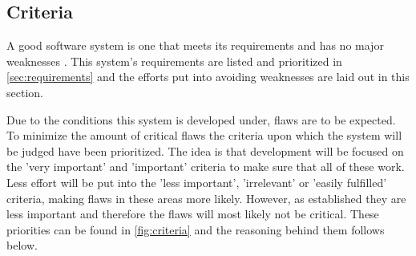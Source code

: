 \subsection{Criteria}\label{sec:architecturecriteria}
A good software system is one that meets its requirements and has no major weaknesses \citep[p.~179]{Rod-Aalborg}.
This system's requirements are listed and prioritized in \cref{sec:requirements} and the efforts put into avoiding weaknesses are laid out in this section.

Due to the conditions this system is developed under, flaws are to be expected.
To minimize the amount of critical flaws the criteria \citep[p.~180]{Rod-Aalborg} upon which the system will be judged have been prioritized.
The idea is that development will be focused on the 'very important' and 'important' criteria to make sure that all of these work.
Less effort will be put into the 'less important', 'irrelevant' or 'easily fulfilled' criteria, making flaws in these areas more likely.
However, as established they are less important and therefore the flaws will most likely not be critical.
These priorities can be found in \cref{fig:criteria} and the reasoning behind them follows below.



